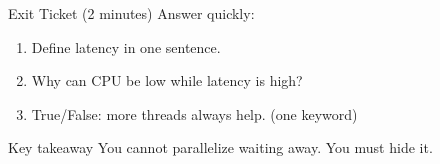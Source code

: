 \documentclass[11pt]{beamer}
\begin{document}
	\begin{frame}{Exit Ticket (2 minutes)}
		Answer quickly:
		\begin{enumerate}
			\item Define latency in one sentence.
			\item Why can CPU be low while latency is high?
			\item True/False: more threads always help. (one keyword)
		\end{enumerate}
		

		\begin{alertblock}{Key takeaway}
			You cannot parallelize waiting away. You must hide it.
		\end{alertblock}
	\end{frame}
	
\end{document}
